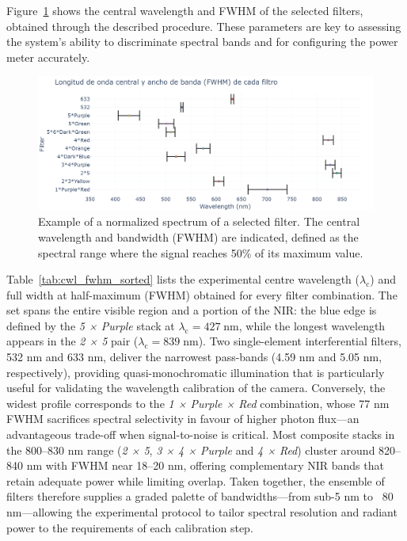 \noindent Figure~\ref{fig:bandwidth_central} shows the central wavelength and FWHM of the selected filters, obtained through the described procedure. These parameters are key to assessing the system’s ability to discriminate spectral bands and for configuring the power meter accurately.

\begin{figure}[H]
    \centering
    \includegraphics[trim=0mm 0mm 50mm 25mm, clip, width=1\textwidth]{Figures/C3/ancho de banda.png}
    \caption{Example of a normalized spectrum of a selected filter. The central wavelength and bandwidth (FWHM) are indicated, defined as the spectral range where the signal reaches 50\% of its maximum value.}
    \label{fig:bandwidth_central}
\end{figure}

\noindent
Table~\ref{tab:cwl_fwhm_sorted} lists the experimental centre wavelength (\(\lambda_{\mathrm{c}}\)) and full width at half-maximum (FWHM) obtained for every filter combination.  
The set spans the entire visible region and a portion of the NIR: the blue edge is defined by the \textit{5 × Purple} stack at \(\lambda_{\mathrm{c}} = 427\;\mathrm{nm}\), while the longest wavelength appears in the \textit{2 × 5} pair (\(\lambda_{\mathrm{c}} = 839\;\mathrm{nm}\)).  
Two single-element interferential filters, 532 nm and 633 nm, deliver the narrowest pass-bands (4.59 nm and 5.05 nm, respectively), providing quasi-monochromatic illumination that is particularly useful for validating the wavelength calibration of the camera.  
Conversely, the widest profile corresponds to the \textit{1 × Purple × Red} combination, whose 77 nm FWHM sacrifices spectral selectivity in favour of higher photon flux—an advantageous trade-off when signal-to-noise is critical.  
Most composite stacks in the 800–830 nm range (\textit{2 × 5}, \textit{3 × 4 × Purple} and \textit{4 × Red}) cluster around 820–840 nm with FWHM near 18–20 nm, offering complementary NIR bands that retain adequate power while limiting overlap.  
Taken together, the ensemble of filters therefore supplies a graded palette of bandwidths—from sub-5 nm to ~80 nm—allowing the experimental protocol to tailor spectral resolution and radiant power to the requirements of each calibration step.\\


